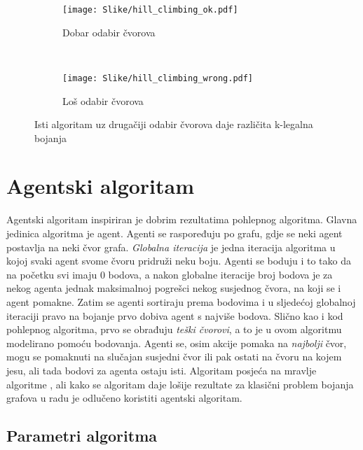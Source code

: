 \documentclass[times, utf8, diplomski, numeric]{fer}
\begin{document}
\begin{figure}
        \centering
        \begin{subfigure}[b]{0.4\textwidth}
                \texttt{[image: Slike/hill\_climbing\_ok.pdf]}
                \caption{Dobar odabir čvorova}
                \label{fig:hill_climbing_ok}
        \end{subfigure}
        ~
        \begin{subfigure}[b]{0.4\textwidth}
                \texttt{[image: Slike/hill\_climbing\_wrong.pdf]}
                \caption{Loš odabir čvorova}
                \label{fig:hill_climbing_wrong}
        \end{subfigure}
        \caption{Isti algoritam uz drugačiji odabir čvorova daje različita k-legalna bojanja}
        \label{fig:hill_climbing}
\end{figure}



\section{Agentski algoritam}

Agentski algoritam inspiriran je dobrim rezultatima pohlepnog algoritma. Glavna jedinica algoritma je agent. Agenti se raspoređuju po grafu, gdje se neki agent postavlja na neki čvor grafa. \emph{Globalna iteracija} je jedna iteracija algoritma u kojoj svaki agent svome čvoru pridruži neku boju. Agenti se boduju i to tako da na početku svi imaju $0$ bodova, a nakon globalne iteracije broj bodova je za nekog agenta jednak maksimalnoj pogrešci nekog susjednog čvora, na koji se i agent pomakne. Zatim se agenti sortiraju prema bodovima i u sljedećoj globalnoj iteraciji pravo na bojanje prvo dobiva agent s najviše bodova. Slično kao i kod pohlepnog algoritma, prvo se obrađuju \emph{teški čvorovi}, a to je u ovom algoritmu modelirano pomoću bodovanja. Agenti se, osim akcije pomaka na \emph{najbolji} čvor, mogu se pomaknuti na slučajan susjedni čvor ili pak ostati na čvoru na kojem jesu, ali tada bodovi za agenta ostaju isti. Algoritam posjeća na mravlje algoritme  \cite{lit3}, ali kako se algoritam daje lošije rezultate za klasični problem bojanja grafova u radu je odlučeno koristiti agentski algoritam.

\subsection{Parametri algoritma}
\end{document}
